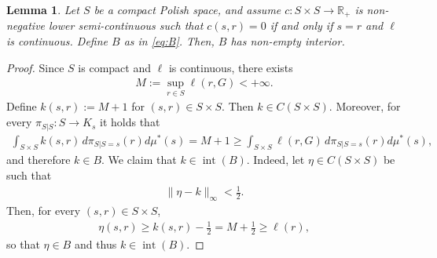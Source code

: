\documentclass{article}
\newcommand{\R}{\mathbb{R}} %
\newtheorem{lemma}[theorem]{Lemma}
\theoremstyle{definition}
\theoremstyle{remarksty}
\begin{document}
\begin{lemma}\label{lemma:fenchel-requirements}
    Let $S$ be a compact Polish space, and assume $c:S\times S\to\R_+$ is non-negative lower semi-continuous such that $c(s,r)=0$ if and only if $s=r$ and $\ell$ is continuous. Define  $B$ as in \eqref{eq:B}. Then, $B$ has non-empty interior.
\end{lemma}
\begin{proof}
Since $S$ is compact and
$\ell$ is continuous, there exists
\begin{align*}
M:=\sup_{r\in S}\ell(r,G)<+\infty .
\end{align*}
Define $k(s,r):=M+1$ for $ (s,r)\in S\times S$.
Then \(k\in C(S\times S)\). Moreover, for every $\pi_{S|S} :S \rightarrow K_s$ it holds that
\begin{align*}
\int_{S\times S} k(s,r)\,d\pi_{S|S=s}(r)d\mu^*(s)
=
M+1
\geq
\int_{S\times S}\ell(r,G)\,d\pi_{S|S=s}(r)d\mu^*(s),
\end{align*}
and therefore $k\in B$.
We claim that $k\in \operatorname{int}(B)$. Indeed, let
$\eta\in C(S\times S)$ be such that
\begin{align*}
\|\eta-k\|_\infty<\frac12 .
\end{align*}
Then, for every \((s,r)\in S\times S\),
\begin{align*}
\eta(s,r)
\geq
k(s,r)-\frac12
=
M+\frac12
\geq
\ell(r),
\end{align*}
so that $\eta \in B$ and thus $k\in\operatorname{int}(B)$.

    

\end{proof}
\end{document}
